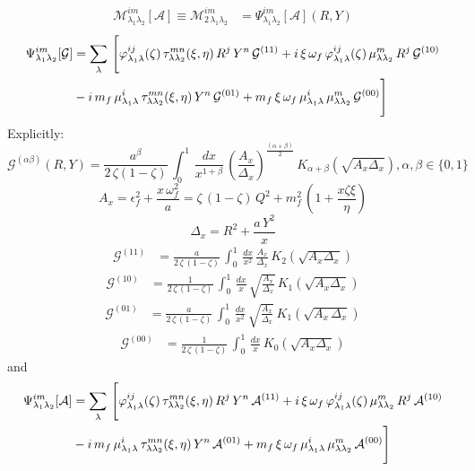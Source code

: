 \documentclass[9pt]{article}
\numberwithin{equation}{section}
\begin{document}
\begin{align}
\mathcal{M}^{im}_{\lambda_{1}\lambda_{2}}[\mathcal{A}] \equiv \mathcal{M}^{im}_{2\,\lambda_{1}\lambda_{2}} & = \Psi^{im}_{\lambda_{1}\lambda_{2}}[\mathcal{A}](R,Y)
\end{align}
\begin{align}
  \Psi^{im}_{\lambda_{1}\lambda_{2}}[\mathcal{G}] & = \sum_{\lambda}\, \Bigg[\varphi^{ij}_{\lambda_{1}\lambda}(\zeta)\,\tau^{mn}_{\lambda\lambda_{2}}(\xi,\eta)\,R^{j}\,Y^{n}\,\mathcal{G}^{(11)}+i\,\xi\,\omega_{f}\,\varphi^{ij}_{\lambda_{1}\lambda}(\zeta)\,\mu^{m}_{\lambda\lambda_{2}}\,R^{j}\,\mathcal{G}^{(10)}\notag \\ & -i\,m_{f}\,\mu^{i}_{\lambda_{1}\lambda}\,\tau^{mn}_{\lambda\lambda_{2}}(\xi,\eta)\,Y^{n}\,\mathcal{G}^{(01)} + m_{f}\,\xi\,\omega_{f}\,\mu^{i}_{\lambda_{1}\lambda}\,\mu^{m}_{\lambda\lambda_{2}}\,\mathcal{G}^{(00)}\Bigg]  
\end{align}
Explicitly: 
$$\mathcal{G}^{(\alpha\beta)}(R,Y) = \frac{a^{\beta}}{2\,\zeta(1-\zeta)}\,\int_{0}^{1}\, \frac{dx}{x^{1+\beta}}\, \left(\frac{A_{x}}{\Delta_{x}}\right)^{\frac{(\alpha + \beta)}{2}}\,K_{\alpha + \beta} (\sqrt{A_{x}\Delta_{x}}), \alpha, \beta \in \{0,1\}$$
$$A_{x} = \epsilon^{2}_{f} + \frac{x\,\omega^{2}_{f}}{a} = \zeta\,(1-\zeta)\,Q^{2} +m^{2}_{f}\,\left(1+\frac{x\zeta\xi}{\eta}\right)$$
$$\Delta_{x} = R^{2} + \frac{a\,Y^{2}}{x}$$
\begin{align}
    \mathcal{G}^{(11)} & = \frac{a}{2\,\zeta\, (1-\zeta)}\, \int_{0}^{1}\, \frac{dx}{x^{2}}\, \frac{A_{x}}{\Delta_{x}}\,K_{2}\left(\sqrt{A_{x}\Delta_{x}}\right)
\end{align}
\begin{align}
    \mathcal{G}^{(10)} & = \frac{1}{2\, \zeta\, (1-\zeta)}\, \int_{0}^{1}\, \frac{dx}{x}\, \sqrt{\frac{A_{x}}{\Delta_{x}}}\, K_{1}\left(\sqrt{A_{x}\Delta_{x}}\right)
\end{align}
\begin{align}
     \mathcal{G}^{(01)} & = \frac{a}{2\, \zeta\, (1-\zeta)}\, \int_{0}^{1}\, \frac{dx}{x^{2}}\, \sqrt{\frac{A_{x}}{\Delta_{x}}}\, K_{1}\left(\sqrt{A_{x}\,\Delta_{x}}\right)
\end{align}
\begin{align}
     \mathcal{G}^{(00)} & = \frac{1}{2\, \zeta\, (1-\zeta)}\, \int_{0}^{1}\, \frac{dx}{x}\, K_{0}\left(\sqrt{A_{x}\Delta_{x}}\right)
\end{align}
and
\begin{align}
  \Psi^{im}_{\lambda_{1}\lambda_{2}}[\mathcal{A}] & = \sum_{\lambda}\, \Bigg[\varphi^{ij}_{\lambda_{1}\lambda}(\zeta)\,\tau^{mn}_{\lambda\lambda_{2}}(\xi,\eta)\,R^{j}\,Y^{n}\,\mathcal{A}^{(11)}+i\,\xi\,\omega_{f}\,\varphi^{ij}_{\lambda_{1}\lambda}(\zeta)\,\mu^{m}_{\lambda\lambda_{2}}\,R^{j}\,\mathcal{A}^{(10)}\notag \\ & -i\,m_{f}\,\mu^{i}_{\lambda_{1}\lambda}\,\tau^{mn}_{\lambda\lambda_{2}}(\xi,\eta)\,Y^{n}\,\mathcal{A}^{(01)} + m_{f}\,\xi\,\omega_{f}\,\mu^{i}_{\lambda_{1}\lambda}\,\mu^{m}_{\lambda\lambda_{2}}\,\mathcal{A}^{(00)}\Bigg]  
\end{align}
\end{document}

